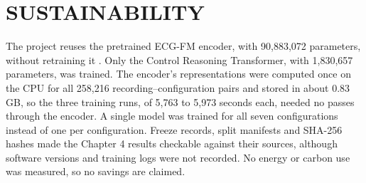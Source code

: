 \section{SUSTAINABILITY}\label{sec:ch5_2}

The project reuses the pretrained ECG-FM encoder, with 90,883,072 parameters, without retraining it \cite{MCKEEN2025ECGFM}. Only the Control Reasoning Transformer, with 1,830,657 parameters, was trained. The encoder's representations were computed once on the CPU for all 258,216 recording--configuration pairs and stored in about 0.83 GB, so the three training runs, of 5,763 to 5,973 seconds each, needed no passes through the encoder. A single model was trained for all seven configurations instead of one per configuration. Freeze records, split manifests and SHA-256 hashes made the Chapter 4 results checkable against their sources, although software versions and training logs were not recorded. No energy or carbon use was measured, so no savings are claimed.